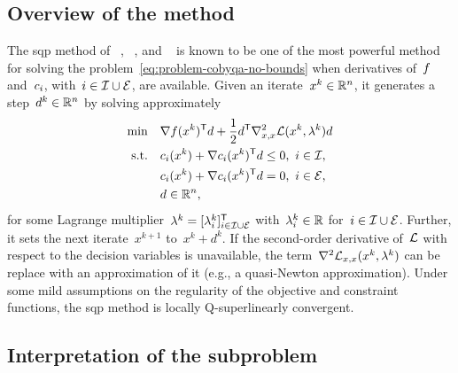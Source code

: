 \subsection{Overview of the method}

The \gls{sqp} method of \citeauthor{Wilson_1963}~\cite{Wilson_1963}, \citeauthor{Han_1976}~\cite{Han_1976,Han_1977}, and \citeauthor{Powell_1978a}~\cite{Powell_1978a,Powell_1978b} is known to be one of the most powerful method for solving the problem~\cref{eq:problem-cobyqa-no-bounds} when derivatives of~$f$ and~$c_{i}$, with~$i \in \mathcal{I} \cup \mathcal{E}$, are available.
Given an iterate~$x^k \in \mathbb{R}^n$, it generates a step~$d^k \in \mathbb{R}^n$ by solving approximately
\begin{subequations}
    \label{eq:sqp-subproblem}
    \begin{align}
        \min        & \quad \nabla \obj(x^k)^{\T} d + \frac{1}{2} d^{\T} \nabla_{x, x}^2 \lag(x^k, \lambda^k) d \label{eq:sqp-subproblem-obj}\\
        \text{s.t.} & \quad \con{i}(x^k) + \nabla \con{i}(x^k)^{\T} d \le 0, ~ i \in \iub,\\
                    & \quad \con{i}(x^k) + \nabla \con{i}(x^k)^{\T} d = 0, ~ i \in \ieq,\\
                    & \quad d \in \R^n,
    \end{align}
\end{subequations}
for some Lagrange multiplier~$\lambda^k = [\lambda_i^k]_{i \in \mathcal{I} \cup \mathcal{E}}^{\mathsf{T}}$ with~$\lambda_i^k \in \mathbb{R}$ for~$i \in \mathcal{I} \cup \mathcal{E}$.
Further, it sets the next iterate~$x^{k + 1}$ to~$x^k + d^k$.
If the second-order derivative of~$\lag$ with respect to the decision variables is unavailable, the term~$\nabla^2 \lag_{x, x}(x^k, \lambda^k)$ can be replace with an approximation of it (e.g., a quasi-Newton approximation).
Under some mild assumptions on the regularity of the objective and constraint functions, the \gls{sqp} method is locally Q-superlinearly convergent.

\subsection{Interpretation of the subproblem}

